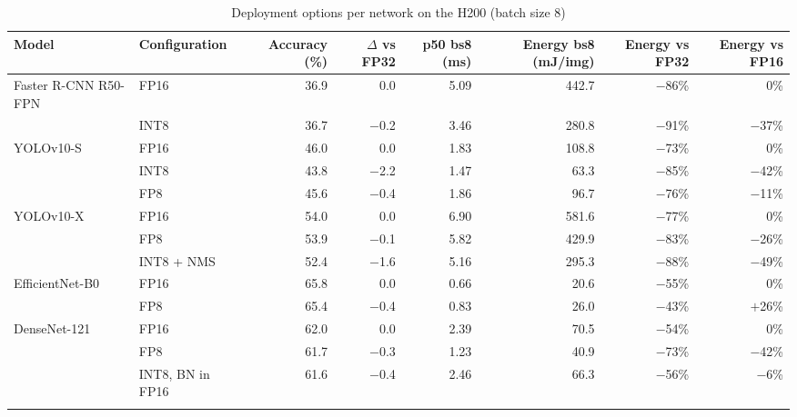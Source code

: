 \documentclass[pdflatex,sn-mathphys-num]{sn-jnl}%
\theoremstyle{thmstyleone}%
\theoremstyle{thmstyletwo}%
\theoremstyle{thmstylethree}%
\begin{document}
\begin{appendices}
\begin{table}
\footnotesize\setlength{\tabcolsep}{4pt}
\caption{Deployment options per network on the H200 (batch size 8)}\label{tab:deployment}
\begin{tabular}{@{}llrrrrrr@{}}
\toprule
Model & Configuration & Accuracy (\%) & $\Delta$ vs FP32 & p50 bs8 (ms) & Energy bs8 (mJ/img) & Energy vs FP32 & Energy vs FP16 \\
\midrule
Faster R-CNN R50-FPN & FP16 & 36.9 & 0.0 & 5.09 & 442.7 & $-$86\% & 0\% \\
 & INT8 & 36.7 & $-$0.2 & 3.46 & 280.8 & $-$91\% & $-$37\% \\
\midrule
YOLOv10-S & FP16 & 46.0 & 0.0 & 1.83 & 108.8 & $-$73\% & 0\% \\
 & INT8 & 43.8 & $-$2.2 & 1.47 & 63.3 & $-$85\% & $-$42\% \\
 & FP8 & 45.6 & $-$0.4 & 1.86 & 96.7 & $-$76\% & $-$11\% \\
\midrule
YOLOv10-X & FP16 & 54.0 & 0.0 & 6.90 & 581.6 & $-$77\% & 0\% \\
 & FP8 & 53.9 & $-$0.1 & 5.82 & 429.9 & $-$83\% & $-$26\% \\
 & INT8 + NMS & 52.4 & $-$1.6 & 5.16 & 295.3 & $-$88\% & $-$49\% \\
\midrule
EfficientNet-B0 & FP16 & 65.8 & 0.0 & 0.66 & 20.6 & $-$55\% & 0\% \\
 & FP8 & 65.4 & $-$0.4 & 0.83 & 26.0 & $-$43\% & $+$26\% \\
\midrule
DenseNet-121 & FP16 & 62.0 & 0.0 & 2.39 & 70.5 & $-$54\% & 0\% \\
 & FP8 & 61.7 & $-$0.3 & 1.23 & 40.9 & $-$73\% & $-$42\% \\
 & INT8, BN in FP16 & 61.6 & $-$0.4 & 2.46 & 66.3 & $-$56\% & $-$6\% \\
\botrule
\end{tabular}
\end{table}


\end{appendices}
\end{document}
